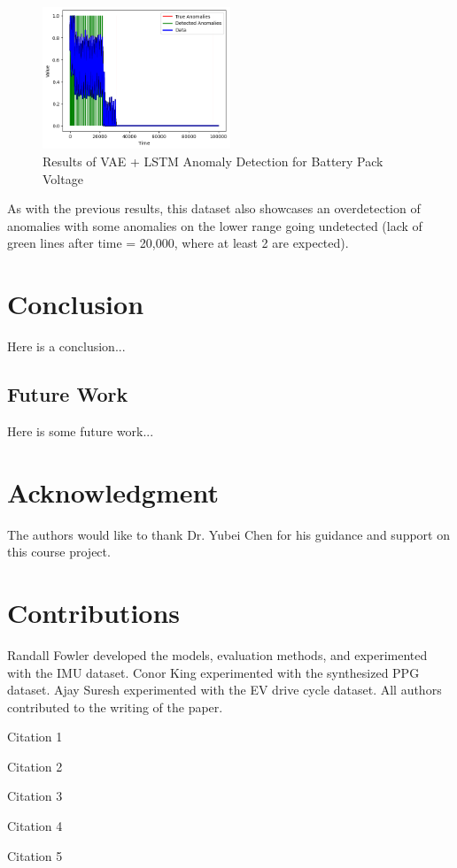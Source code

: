 \documentclass[conference]{IEEEtran}
\begin{document}
\begin{figure}[htbp]
    \centering
    \includegraphics[width=0.5\textwidth]{aj_fig_6.png}
    \caption{Results of VAE + LSTM Anomaly Detection for Battery Pack Voltage}
    \label{aj_fig__6}
\end{figure}

As with the previous results, this dataset also showcases an overdetection of anomalies with some anomalies on the lower range going undetected (lack of green lines after time = 20,000, where at least 2 are expected). 

\section{Conclusion}%
Here is a conclusion...

\subsection{Future Work}
Here is some future work...

\section*{Acknowledgment}
The authors would like to thank Dr. Yubei Chen for his guidance and support on this course project.

\section*{Contributions}
Randall Fowler developed the models, evaluation methods, and experimented with the IMU dataset. 
Conor King experimented with the synthesized PPG dataset. 
Ajay Suresh experimented with the EV drive cycle dataset. 
All authors contributed to the writing of the paper.

\begin{thebibliography}{1}


Citation 1

Citation 2

Citation 3

Citation 4

Citation 5

\end{thebibliography}
\end{document}
